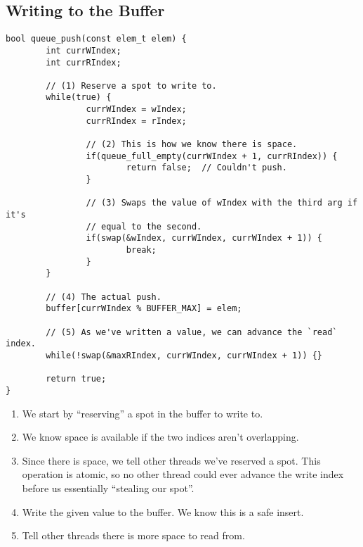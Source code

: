 \documentclass[titlepage]{article}
\begin{document}
\subsection{Writing to the Buffer}
\begin{lstlisting}
bool queue_push(const elem_t elem) {
        int currWIndex;
        int currRIndex;

        // (1) Reserve a spot to write to.
        while(true) {
                currWIndex = wIndex;
                currRIndex = rIndex;

                // (2) This is how we know there is space.
                if(queue_full_empty(currWIndex + 1, currRIndex)) {
                        return false;  // Couldn't push.
                }

                // (3) Swaps the value of wIndex with the third arg if it's
                // equal to the second.
                if(swap(&wIndex, currWIndex, currWIndex + 1)) {
                        break;
                }
        }

        // (4) The actual push.
        buffer[currWIndex % BUFFER_MAX] = elem;

        // (5) As we've written a value, we can advance the `read` index.
        while(!swap(&maxRIndex, currWIndex, currWIndex + 1)) {}

        return true;
}  
\end{lstlisting}
\begin{enumerate}
\item We start by ``reserving'' a spot in the buffer to write to.
\item We know space is available if the two indices aren't overlapping.
\item Since there is space, we tell other threads we've reserved a spot. This
  operation is atomic, so no other thread could ever advance the write index
  before us essentially ``stealing our spot''.
\item Write the given value to the buffer. We know this is a safe insert.
\item Tell other threads there is more space to read from.
\end{enumerate}
\end{document}
